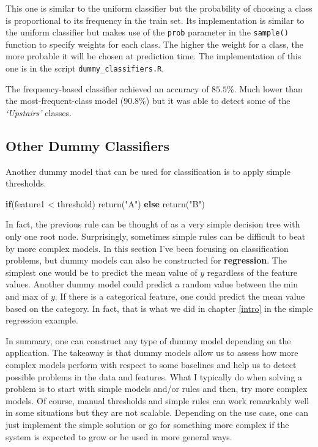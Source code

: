 \documentclass[
  11pt,
]{krantz}
\newenvironment{Shaded}{\begin{snugshade}}{\end{snugshade}}
\newcommand{\ControlFlowTok}[1]{\textcolor[rgb]{0.27,0.27,0.27}{\textbf{#1}}}
\newcommand{\FunctionTok}[1]{\textcolor[rgb]{0,0,0}{#1}}
\newcommand{\NormalTok}[1]{#1}
\newcommand{\SpecialCharTok}[1]{\textcolor[rgb]{0,0,0}{#1}}
\newcommand{\StringTok}[1]{\textcolor[rgb]{0.5,0.5,0.5}{#1}}
\begin{document}
This one is similar to the uniform classifier but the probability of choosing a class is proportional to its frequency in the train set. Its implementation is similar to the uniform classifier but makes use of the \texttt{prob} parameter in the \texttt{sample()} function to specify weights for each class. The higher the weight for a class, the more probable it will be chosen at prediction time. The implementation of this one is in the script \texttt{dummy\_classifiers.R}.

The frequency-based classifier achieved an accuracy of \(85.5\%\). Much lower than the most-frequent-class model (\(90.8\%\)) but it was able to detect some of the \emph{`Upstairs'} classes.

\hypertarget{other-dummy-classifiers}{%
\subsection{Other Dummy Classifiers}\label{other-dummy-classifiers}}

Another dummy model that can be used for classification is to apply simple thresholds.

\begin{Shaded}
\begin{Highlighting}[]
\ControlFlowTok{if}\NormalTok{(feature1 }\SpecialCharTok{\textless{}}\NormalTok{ threshold)}
  \FunctionTok{return}\NormalTok{(}\StringTok{"A"}\NormalTok{)}
\ControlFlowTok{else}
  \FunctionTok{return}\NormalTok{(}\StringTok{"B"}\NormalTok{)}
\end{Highlighting}
\end{Shaded}

In fact, the previous rule can be thought of as a very simple decision tree with only one root node. Surprisingly, sometimes simple rules can be difficult to beat by more complex models. In this section I've been focusing on classification problems, but dummy models can also be constructed for \textbf{regression}. The simplest one would be to predict the mean value of \(y\) regardless of the feature values. Another dummy model could predict a random value between the min and max of \(y\). If there is a categorical feature, one could predict the mean value based on the category. In fact, that is what we did in chapter \ref{intro} in the simple regression example.

In summary, one can construct any type of dummy model depending on the application. The takeaway is that dummy models allow us to assess how more complex models perform with respect to some baselines and help us to detect possible problems in the data and features. What I typically do when solving a problem is to start with simple models and/or rules and then, try more complex models. Of course, manual thresholds and simple rules can work remarkably well in some situations but they are not scalable. Depending on the use case, one can just implement the simple solution or go for something more complex if the system is expected to grow or be used in more general ways.
\end{document}
